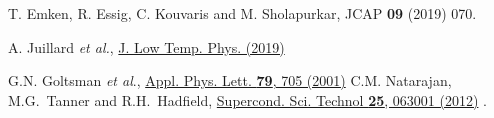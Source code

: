 \begin{thebibliography}{100}
   T. Emken, R. Essig, C. Kouvaris and M. Sholapurkar, 
   JCAP {\bf 09} (2019) 070. 

A. Juillard {\it et al.},
\href{\DOI/10.1007/s10909-019-02269-5}{J. Low Temp. Phys. (2019)} 

G.N. Goltsman {\it et al}., 
\href{\DOI/10.1063/1.1388868}{Appl. Phys. Lett. {\bf 79}, 705 (2001)}
C.M. Natarajan, M.G.~Tanner and R.H.~Hadfield, 
\href{\DOI/10.1088/0953-2048/25/6/063001}{Supercond. Sci. Technol {\bf 25}, 063001 (2012)} .





\end{thebibliography}